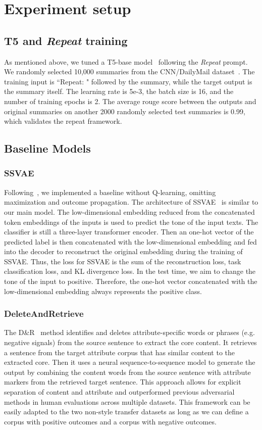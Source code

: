 \documentclass{article}
\begin{document}
\section{Experiment setup}\label{app:exp-set}
\subsection{T5 and \textit{Repeat} training}
As mentioned above, we tuned a T5-base model~\cite{raffel2020exploring} following the \textit{Repeat} prompt. We randomly selected 10,000 summaries from the CNN/DailyMail dataset~\cite{hermann2015teaching}. The training input is ``Repeat: " followed by the summary, while the target output is the summary itself. The learning rate is 5e-3, the batch size is 16, and the number of training epochs is 2. The average rouge score between the outputs and original summaries on another 2000 randomly selected test summaries is 0.99, which validates the repeat framework. 
\subsection{Baseline Models}
\subsubsection{SSVAE}
Following~\cite{zhang2024causal}, we implemented a baseline without Q-learning, omitting maximization and outcome propagation. The architecture of SSVAE~\cite{kingma2014semi} is similar to our main model. The low-dimensional embedding reduced from the concatenated token embeddings of the inputs is used to predict the tone of the input texts. The classifier is still a three-layer transformer encoder. Then an one-hot vector of the predicted label is then concatenated with the low-dimensional embedding and fed into the decoder to reconstruct the original embedding during the training of SSVAE. Thus, the loss for SSVAE is the sum of the reconstruction loss, task classification loss, and KL divergence loss. In the test time, we aim to change the tone of the input to positive. Therefore, the one-hot vector concatenated with the low-dimensional embedding always represents the positive class.
\subsubsection{DeleteAndRetrieve}
The D\&R~\cite{li2018delete} method identifies and deletes attribute-specific words or phrases (e.g. negative signals) from the source sentence to extract the core content. It retrieves a sentence from the target attribute corpus that has similar content to the extracted core. Then it uses a neural sequence-to-sequence model to generate the output by combining the content words from the source sentence with attribute markers from the retrieved target sentence. This approach allows for explicit separation of content and attribute and outperformed previous adversarial methods in human evaluations across multiple datasets. This framework can be easily adapted to the two non-style transfer datasets as long as we can define a corpus with positive outcomes and a corpus with negative outcomes.
\end{document}
